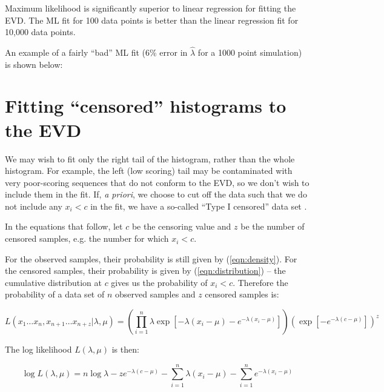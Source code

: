 Maximum likelihood is significantly superior to linear regression for
fitting the EVD. The ML fit for 100 data points is better than the
linear regression fit for 10,000 data points.

\pagebreak
An example of a fairly ``bad'' ML fit (6\% error in $\hat{\lambda}$
for a 1000 point simulation) is shown below:

\centerline{}



\section{Fitting ``censored'' histograms to the EVD}

We may wish to fit only the right tail of the histogram, rather than
the whole histogram. For example, the left (low scoring) tail may be
contaminated with very poor-scoring sequences that do not conform to
the EVD, so we don't wish to include them in the fit. If, {\em a
priori}, we choose to cut off the data such that we do not include any
$x_i < c$ in the fit, we have a so-called ``Type I censored'' data set
\cite{Lawless82}.

In the equations that follow, let $c$ be the censoring value and $z$
be the number of censored samples, e.g. the number for which $x_{i} <
c$.

For the observed samples, their probability is still given by
(\ref{eqn:density}). For the censored samples, their probability is
given by (\ref{eqn:distribution}) -- the cumulative distribution at
$c$ gives us the probability of $x_i < c$. Therefore the probability of
a data set of $n$ observed samples and $z$ censored samples is:

\[
L(x_1 \ldots x_n, x_{n+1} \ldots x_{n+z} | \lambda, \mu) = 
\left( \prod_{i=1}^{n} \lambda \exp \left[ 
-\lambda(x_i - \mu) - e^{-\lambda(x_i - \mu)} \right]
\right)
\left(
\exp \left[ -e^{- \lambda (c - \mu)} \right]
\right)^z
\]

The log likelihood $L(\lambda, \mu)$ is then:

\begin{equation}
\log L(\lambda, \mu) = 
n \log \lambda 
- z e^{-\lambda(c - \mu)}
- \sum_{i=1}^{n} \lambda(x_i - \mu) 
- \sum_{i=1}^{n} e^{-\lambda(x_i - \mu)}
\label{eqn:censor_logL}
\end{equation}


